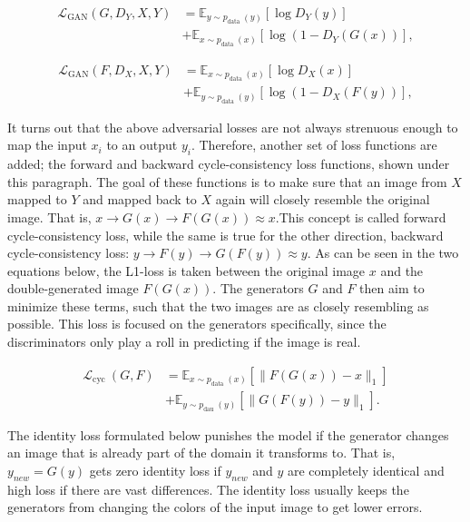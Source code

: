 \documentclass[11pt, fleqn, titlepage]{article}
\newcommand{\1}[1]{\mathds{1}\left[#1\right]}
\begin{document}
\[\begin{aligned}
	\mathcal{L}_{\mathrm{GAN}}\left(G, D_{Y}, X, Y\right) &=\mathbb{E}_{y \sim p_{\text {data }}(y)}\left[\log D_{Y}(y)\right] \\
	&+\mathbb{E}_{x \sim p_{\text {data }}(x)}\left[\log \left(1-D_{Y}(G(x))\right],\right.
\end{aligned}\]

\[\begin{aligned}
	\mathcal{L}_{\mathrm{GAN}}\left(F, D_{X}, X, Y\right) &=\mathbb{E}_{x \sim p_{\text {data }}(x)}\left[\log D_{X}(x)\right] \\
	&+\mathbb{E}_{y \sim p_{\text {data }}(y)}\left[\log \left(1-D_{X}(F(y))\right],\right.
\end{aligned}\]

It turns out that the above adversarial losses are not always strenuous enough to map the input $x_i$ to an output $y_i$. Therefore, another set of loss functions are added; the forward and backward cycle-consistency loss functions, shown under this paragraph. The goal of these functions is to make sure that an image from $X$ mapped to $Y$ and mapped back to $X$ again will closely resemble the original image. That is, $x \rightarrow G(x) \rightarrow F(G(x)) \approx x$.This concept is called forward cycle-consistency loss, while the same is true for the other direction, backward cycle-consistency loss: $y \rightarrow F(y) \rightarrow G(F(y)) \approx y$. As can be seen in the two equations below, the L1-loss is taken between the original image $x$ and the double-generated image $F(G(x))$. The generators $G$ and $F$ then aim to minimize these terms, such that the two images are as closely resembling as possible. This loss is focused on the generators specifically, since the discriminators only play a roll in predicting if the image is real.

\[\begin{aligned}
	\mathcal{L}_{\text {cyc }}(G, F) &=\mathbb{E}_{x \sim p_{\text {data }}(x)}\left[\|F(G(x))-x\|_{1}\right] \\
	&+\mathbb{E}_{y \sim p_{\text {dau }}(y)}\left[\|G(F(y))-y\|_{1}\right] .
\end{aligned}\]

The identity loss formulated below punishes the model if the generator changes an image that is already part of the domain it transforms to. That is, $y_{new} = G(y)$ gets zero identity loss if $y_{new}$ and $y$ are completely identical and high loss if there are vast differences. The identity loss usually keeps the generators from changing the colors of the input image to get lower errors.
\end{document}
